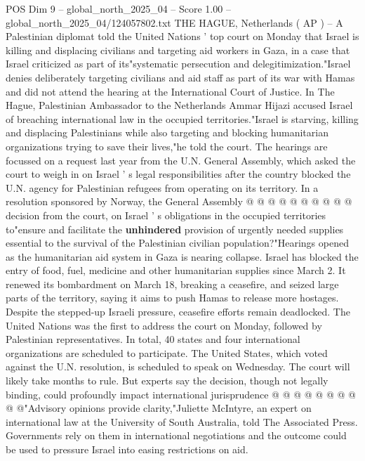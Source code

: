 \begin{textsample}{POS Dim 9 – global\_north\_2025\_04 – Score 1.00 – global\_north\_2025\_04/124057802.txt}  \label{ex:f9_pos_427}
THE HAGUE, Netherlands ( AP ) -- A Palestinian diplomat told the United Nations ' top court on Monday that Israel is killing and displacing civilians and targeting aid workers in Gaza, in a case that Israel criticized as part of its"systematic persecution and delegitimization."Israel denies deliberately targeting civilians and aid staff as part of its war with Hamas and did not attend the hearing at the International Court of Justice.
In The Hague, Palestinian Ambassador to the Netherlands Ammar Hijazi accused Israel of breaching international law in the occupied territories."Israel is starving, killing and displacing Palestinians while also targeting and blocking humanitarian organizations trying to save their lives,"he told the court.
The hearings are focussed on a request last year from the U.N.
General Assembly, which asked the court to weigh in on Israel ' s legal responsibilities after the country blocked the U.N. agency for Palestinian refugees from operating on its territory.
In a resolution sponsored by Norway, the General Assembly @ @ @ @ @ @ @ @ @ @ decision from the court, on Israel ' s obligations in the occupied territories to"ensure and facilitate the \textbf{unhindered} provision of urgently needed supplies essential to the survival of the Palestinian civilian population?"Hearings opened as the humanitarian aid system in Gaza is nearing collapse.
Israel has blocked the entry of food, fuel, medicine and other humanitarian supplies since March 2.
It renewed its bombardment on March 18, breaking a ceasefire, and seized large parts of the territory, saying it aims to push Hamas to release more hostages.
Despite the stepped-up Israeli pressure, ceasefire efforts remain deadlocked.
The United Nations was the first to address the court on Monday, followed by Palestinian representatives.
In total, 40 states and four international organizations are scheduled to participate.
The United States, which voted against the U.N. resolution, is scheduled to speak on Wednesday.
The court will likely take months to rule.
But experts say the decision, though not legally binding, could profoundly impact international jurisprudence @ @ @ @ @ @ @ @ @ @"Advisory opinions provide clarity,"Juliette McIntyre, an expert on international law at the University of South Australia, told The Associated Press.
Governments rely on them in international negotiations and the outcome could be used to pressure Israel into easing restrictions on aid.

\end{textsample}
